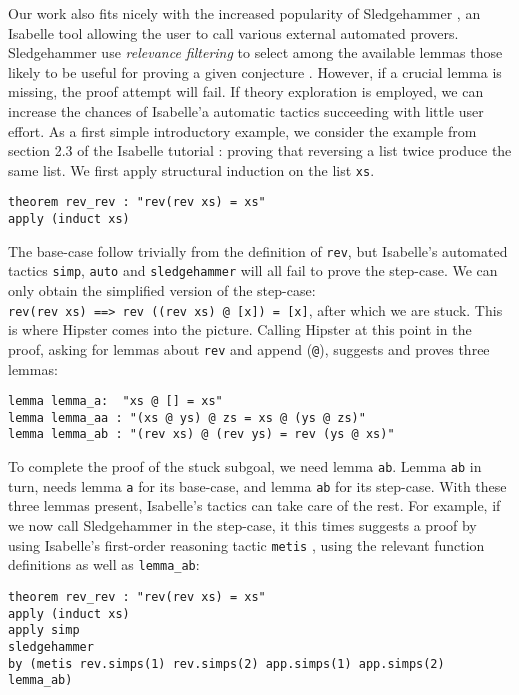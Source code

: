 Our work also fits nicely with the increased popularity of Sledgehammer \cite{sledgehammer}, an Isabelle tool allowing the user to call various external automated provers. Sledgehammer use \emph{relevance filtering} to select among the available lemmas those likely to be useful for proving a given conjecture \cite{mash}. However, if a crucial lemma is missing, the proof attempt will fail. If theory exploration is employed, we can increase the chances of Isabelle'a automatic tactics succeeding with little user effort. As a first simple introductory example, we consider the example from section 2.3 of the Isabelle tutorial \cite{isabelle}: proving that reversing a list twice produce the same list. We first apply structural induction on the list \texttt{xs}.
\begin{verbatim}
theorem rev_rev : "rev(rev xs) = xs"
apply (induct xs)
\end{verbatim}
The base-case follow trivially from the definition of \texttt{rev}, but Isabelle's automated tactics \texttt{simp}, \texttt{auto} and \texttt{sledgehammer} will all fail to prove the step-case. We can only obtain the simplified version of the step-case: \\\texttt{rev(rev xs) ==> rev ((rev xs) @ [x]) = [x]}, after which we are stuck. This is where Hipster comes into the picture. Calling Hipster at this point in the proof, asking for lemmas about \texttt{rev} and append (\texttt{@}), suggests and proves three lemmas: 
\begin{verbatim}
lemma lemma_a:  "xs @ [] = xs"
lemma lemma_aa : "(xs @ ys) @ zs = xs @ (ys @ zs)"
lemma lemma_ab : "(rev xs) @ (rev ys) = rev (ys @ xs)"
\end{verbatim}
To complete the proof of the stuck subgoal, we need lemma \texttt{ab}. Lemma \texttt{ab} in turn, needs lemma \texttt{a} for its base-case, and lemma \texttt{ab} for its step-case. With these three lemmas present, Isabelle's tactics can take care of the rest. For example, if we now call Sledgehammer in the step-case, it this times suggests a proof by using Isabelle's first-order reasoning tactic \texttt{metis} \cite{metis}, using the relevant function definitions as well as \texttt{lemma\_ab}:
\begin{small}
\begin{verbatim}
theorem rev_rev : "rev(rev xs) = xs"
apply (induct xs)
apply simp
sledgehammer
by (metis rev.simps(1) rev.simps(2) app.simps(1) app.simps(2) lemma_ab)
\end{verbatim}
\end{small}

